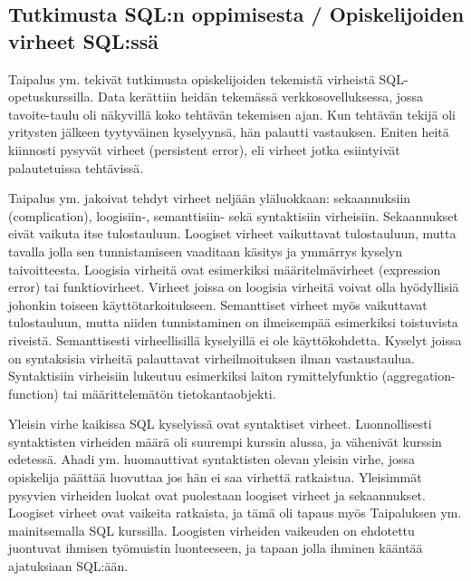\documentclass[finnish,twoside,openright]{HYgraduMLDS}
\begin{document}
\subsection{Tutkimusta SQL:n oppimisesta / Opiskelijoiden virheet SQL:ssä}

Taipalus ym. \cite{Taipalus:2019:EFS:3287324.3287359} tekivät tutkimusta opiskelijoiden tekemistä virheistä SQL-opetuskurssilla. Data kerättiin heidän tekemässä verkkosovelluksessa, jossa tavoite-taulu oli näkyvillä koko tehtävän tekemisen ajan. Kun tehtävän tekijä oli yritysten jälkeen tyytyväinen kyselyynsä, hän palautti vastauksen. Eniten heitä kiinnosti pysyvät virheet (persistent error), eli virheet jotka esiintyivät palautetuissa tehtävissä. 

Taipalus ym. \cite{Taipalus:2019:EFS:3287324.3287359} jakoivat tehdyt virheet neljään yläluokkaan: sekaannuksiin (complication), loogisiin-, semanttisiin- sekä syntaktisiin virheisiin. Sekaannukset eivät vaikuta itse tulostauluun. %
Loogiset virheet vaikuttavat tulostauluun, mutta tavalla jolla sen tunnistamiseen vaaditaan käsitys ja ymmärrys kyselyn taivoitteesta. Loogisia virheitä ovat esimerkiksi määritelmävirheet (expression error) tai funktiovirheet. Virheet joissa on loogisia virheitä voivat olla hyödyllisiä johonkin toiseen käyttötarkoitukseen. Semanttiset virheet myös vaikuttavat tulostauluun, mutta niiden tunnistaminen on ilmeisempää esimerkiksi toistuvista riveistä. Semanttisesti virheellisillä kyselyillä ei ole käyttökohdetta. Kyselyt joissa on syntaksisia virheitä palauttavat virheilmoituksen ilman vastaustaulua. Syntaktisiin virheisiin lukeutuu esimerkiksi laiton rymittelyfunktio (aggregation-function) tai määrittelemätön tietokantaobjekti.

Yleisin virhe kaikissa SQL kyselyissä ovat syntaktiset virheet\cite{Taipalus:2019:EFS:3287324.3287359, Ahadi:2016:SSM:2839509.2844640}. Luonnollisesti syntaktisten virheiden määrä oli suurempi kurssin alussa, ja vähenivät kurssin edetessä. Ahadi ym. \cite{Ahadi:2016:SSM:2839509.2844640} huomauttivat syntaktisten olevan yleisin virhe, jossa opiskelija päättää luovuttaa jos hän ei saa virhettä ratkaistua. Yleisimmät pysyvien virheiden luokat ovat puolestaan loogiset virheet ja sekaannukset\cite{Taipalus:2019:EFS:3287324.3287359}. Loogiset virheet ovat vaikeita ratkaista, ja tämä oli tapaus myös Taipaluksen ym. \cite{Taipalus:2019:EFS:3287324.3287359} mainitsemalla SQL kurssilla. Loogisten virheiden vaikeuden on ehdotettu juontuvat ihmisen työmuistin luonteeseen, ja tapaan jolla ihminen kääntää ajatuksiaan SQL:ään\cite{SMELCER1995353}. 
\end{document}

